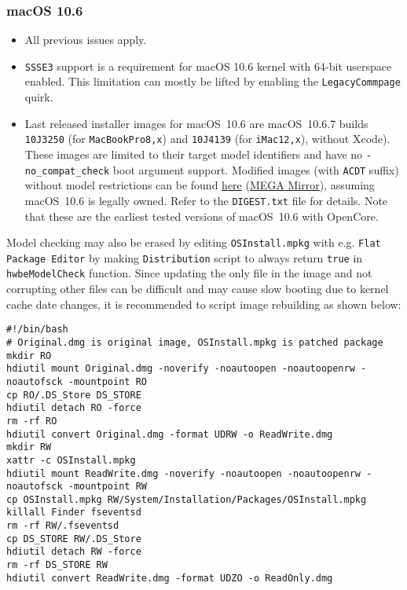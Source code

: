 \documentclass[]{article}
\makeatletter
\renewcommand{\label}[1]{%
\zref@wrapper@immediate{\oldlabel{#1}}}  %
\makeatother
\begin{document}
\subsubsection{macOS 10.6}\label{legacy106}

\begin{itemize}
  \item All previous issues apply.
  \item \texttt{SSSE3} support is a requirement for macOS 10.6 kernel
    with 64-bit userspace enabled. This limitation can mostly be lifted
    by enabling the \texttt{LegacyCommpage} quirk.
  \item Last released installer images for macOS~10.6 are macOS~10.6.7
    builds \texttt{10J3250} (for \texttt{MacBookPro8,x}) and
    \texttt{10J4139} (for \texttt{iMac12,x}), without Xcode). These
    images are limited to their target model identifiers and have no
    \texttt{-no\_compat\_check} boot argument support. Modified images
    (with \texttt{ACDT} suffix) without model restrictions can be found
    \href{https://archive.org/details/10.6.7-10j3250-disk-images}{here}
    (\href{https://mega.nz/folder/z5YUhYTb#gA\_IRY5KMuYpnNCg7kR3ug}{MEGA Mirror}),
    assuming macOS~10.6 is legally owned. Refer to the \texttt{DIGEST.txt} file
    for details. Note that these are the earliest tested
    versions of macOS~10.6 with OpenCore.
\end{itemize}

  Model checking may also be erased by editing \texttt{OSInstall.mpkg}
  with e.g. \texttt{Flat Package Editor} by making \texttt{Distribution}
  script to always return \texttt{true} in \texttt{hwbeModelCheck} function.
  Since updating the only file in the image and not corrupting other files
  can be difficult and may cause slow booting due to kernel cache date
  changes, it is recommended to script image rebuilding as shown below:

\begin{lstlisting}[label=snowrebuild, style=ocbash]
#!/bin/bash
# Original.dmg is original image, OSInstall.mpkg is patched package
mkdir RO
hdiutil mount Original.dmg -noverify -noautoopen -noautoopenrw -noautofsck -mountpoint RO
cp RO/.DS_Store DS_STORE
hdiutil detach RO -force
rm -rf RO
hdiutil convert Original.dmg -format UDRW -o ReadWrite.dmg
mkdir RW
xattr -c OSInstall.mpkg
hdiutil mount ReadWrite.dmg -noverify -noautoopen -noautoopenrw -noautofsck -mountpoint RW
cp OSInstall.mpkg RW/System/Installation/Packages/OSInstall.mpkg
killall Finder fseventsd
rm -rf RW/.fseventsd
cp DS_STORE RW/.DS_Store
hdiutil detach RW -force
rm -rf DS_STORE RW
hdiutil convert ReadWrite.dmg -format UDZO -o ReadOnly.dmg
\end{lstlisting}
\end{document}
